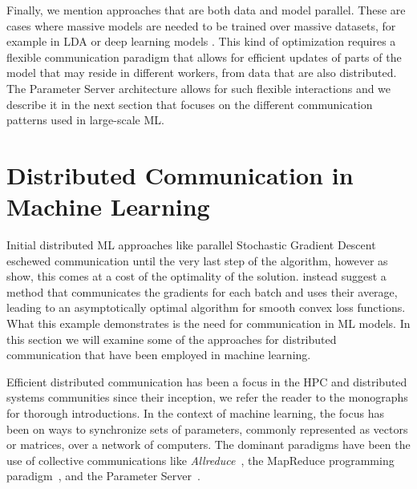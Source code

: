 Finally, we mention approaches that are both data and model parallel. These are
cases where massive models are needed to be trained over massive datasets, for
example in LDA or deep learning models \cite{large-scale-dl, lightLDA}. This kind of
optimization requires a flexible communication paradigm that allows for efficient
updates of parts of the model that may reside in different workers, from data
that are also distributed. The Parameter Server architecture\cite{muPS}
allows for such flexible interactions and we describe it in the next
section that focuses on the different communication patterns used
in large-scale ML.

\section{Distributed Communication in Machine Learning}
\label{sec:bg-ml-communication}

Initial distributed ML approaches like parallel Stochastic Gradient Descent
\cite{parallel-sgd} eschewed communication until the very last step of the
algorithm, however as \citet{dekel-optimal-distributed} show, this comes
at a cost of the optimality of the solution. \citet{dekel-optimal-distributed}
instead suggest a method that communicates the gradients for each batch and uses
their average, leading to an asymptotically optimal algorithm for smooth
convex loss functions. What this example demonstrates is the need for communication
in ML models. In this section we will examine some of the approaches for distributed
communication that have been employed in machine learning.

Efficient distributed communication has been a focus in the HPC and distributed systems
communities since their inception, we refer the reader to the monographs
\cite{hpc-intro, distributed-systems-book, distributed-systems-programming, distributed-systems-computation} for thorough introductions.
In the context of machine learning, the focus has been on ways to synchronize
sets of parameters, commonly represented as vectors or matrices, over a network
of computers. The dominant paradigms have been the use of collective communications
like \emph{Allreduce}~\cite{allreduce}, the MapReduce programming paradigm~\cite{mapreduce},
and the Parameter Server~\cite{muPS}.

